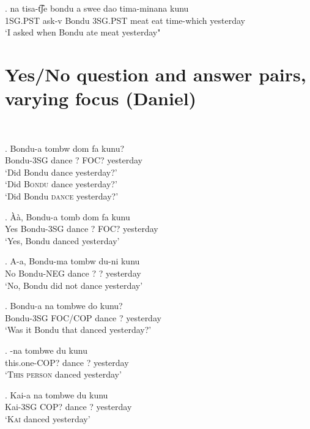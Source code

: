 \documentclass{assets/fieldnotes}
\begin{document}
{

\exg. na tisa-t͡ʃe bondu a swee dao tima-minana kunu\\
1SG.PST ask-v Bondu 3SG.PST meat eat time-which yesterday\\
    `I asked when Bondu ate meat yesterday"\\

    
\section{Yes/No question and answer pairs, varying focus (Daniel)}
  \\


\exg. Bondu-a tombw dom fa kunu?\\
Bondu-3SG dance ? FOC? yesterday\\
`Did Bondu dance yesterday?'\\
`Did \textsc{Bondu} dance yesterday?'\\
`Did Bondu \textsc{dance} yesterday?'


\exg. Àà, Bondu-a tomb dom fa kunu\\
Yes Bondu-3SG dance ? FOC? yesterday\\
`Yes, Bondu danced yesterday'


\exg. A-a, Bondu-ma tombw du-ni kunu\\
No Bondu-NEG dance ? ? yesterday\\
`No, Bondu did not dance yesterday'

\exg. Bondu-a na tombwe do kunu?\\
Bondu-3SG FOC/COP dance ? yesterday\\
`Was it Bondu that danced yesterday?'

\exg. -na tombwe du kunu\\
this.one-COP? dance ? yesterday\\
`\textsc{This person} danced yesterday'

\exg. Kai-a na tombwe du kunu\\
Kai-3SG COP? dance ? yesterday\\
`\textsc{Kai} danced yesterday'

}
\end{document}

